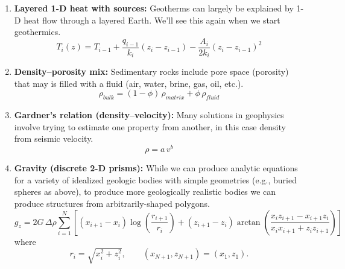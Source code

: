 \documentclass[11pt,a4paper]{article}
\begin{document}
\begin{enumerate}[label=Q\arabic*.,itemsep=6pt]
  \item \textbf{Layered 1-D heat with sources:}
  Geotherms can largely be explained by 1-D heat flow through a layered Earth.  We'll see this again when we start geothermics.
  \[
    T_i(z) = T_{i-1} + \frac{q_{i-1}}{k_i}(z_i - z_{i-1}) - \frac{A_i}{2k_i}(z_i - z_{i-1})^2
  \]
  \answerbox[2cm]

  \item \textbf{Density--porosity mix:}
  Sedimentary rocks include pore space (porosity) that may is filled with a fluid (air, water, brine, gas, oil, etc.).
  \[
    \rho_\mathit{bulk} = (1-\phi)\,\rho_\mathit{matrix} + \phi\,\rho_\mathit{fluid}
  \]
  \answerbox[2cm]

  \item \textbf{Gardner's relation (density--velocity):}
  Many solutions in geophysics involve trying to estimate one property from another, in this case density from seismic velocity.
  \[
    \rho = a\,v^b
  \]
  \answerbox[2cm]

  \item \textbf{Gravity (discrete 2-D prisms):}
  While we can produce analytic equations for a variety of idealized geologic bodies with simple geometries (e.g., buried spheres as above), to produce more geologically realistic bodies we can produce structures from arbitrarily-shaped polygons.
  \[
    g_z =
    2G\,\Delta\rho
    \sum_{i=1}^{N}
    \left[
    (x_{i+1}-x_i)\log\!\left(\frac{r_{i+1}}{r_i}\right)
    +
    (z_{i+1}-z_i)
    \arctan\!\left(
    \frac{x_i z_{i+1} - x_{i+1} z_i}
    {x_i x_{i+1} + z_i z_{i+1}}
    \right)
    \right]
  \] 
  where
  \[
    r_i = \sqrt{x_i^2 + z_i^2}, 
    \qquad
    (x_{N+1}, z_{N+1}) = (x_1, z_1).
  \]
  \answerbox[2cm]
\end{enumerate}
\end{document}
